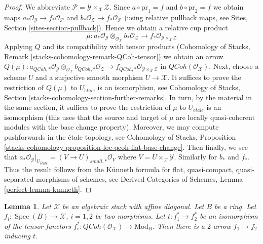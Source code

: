 \documentclass{stacks-project}
\theoremstyle{plain}
\newtheorem{lemma}[subsection]{Lemma}
\theoremstyle{definition}
\theoremstyle{remark}
\numberwithin{equation}{subsection}
\def\Spec{\mathop{\mathrm{Spec}}}
\def\etale{{\acute{e}tale}}
\def\QCoh{\mathit{QCoh}}
\begin{document}
\begin{proof}
We abbreviate $\mathcal{P} = \mathcal{Y} \times_\mathcal{X} \mathcal{Z}$.
Since $a \circ \text{pr}_1 = f$ and $b \circ \text{pr}_2 = f$
we obtain maps $a_*\mathcal{O}_\mathcal{Y} \to f_*\mathcal{O}_\mathcal{P}$
and $b_*\mathcal{O}_\mathcal{Z} \to f_*\mathcal{O}_\mathcal{P}$ (using
relative pullback maps, see Sites, Section \ref{sites-section-pullback}).
Hence we obtain a relative cup product
$$
\mu :
a_*\mathcal{O}_\mathcal{Y}
\otimes_{\mathcal{O}_\mathcal{X}}
b_*\mathcal{O}_\mathcal{Z} \longrightarrow
f_*\mathcal{O}_{\mathcal{Y} \times_\mathcal{X} \mathcal{Z}}
$$
Applying $Q$ and its compatibility with tensor products
(Cohomology of Stacks, Remark \ref{stacks-cohomology-remark-QCoh-tensor})
we obtain an arrow
$Q(\mu) : a_{\QCoh, *}\mathcal{O}_\mathcal{Y}
\otimes_{\mathcal{O}_\mathcal{X}}
b_{\QCoh, *}\mathcal{O}_\mathcal{Z} \to
f_{\QCoh, *}\mathcal{O}_{\mathcal{Y} \times_\mathcal{X} \mathcal{Z}}$
in $\QCoh(\mathcal{O}_\mathcal{X})$.
Next, choose a scheme $U$ and a surjective smooth morphism
$U \to \mathcal{X}$. It suffices to prove the restriction of
$Q(\mu)$ to $U_\etale$ is an isomorphism, see
Cohomology of Stacks, Section \ref{stacks-cohomology-section-further-remarks}.
In turn, by the material in the same section,
it suffices to prove the restriction of $\mu$ to $U_\etale$
is an isomorphism (this uses that the source and target of $\mu$
are locally quasi-coherent modules with the base change property).
Moreover, we may compute pushforwards in the \'etale topology, see
Cohomology of Stacks, Proposition
\ref{stacks-cohomology-proposition-loc-qcoh-flat-base-change}.
Then finally, we see that
$a_*\mathcal{O}_\mathcal{Y}|_{U_\etale} = (V \to U)_{small, *}\mathcal{O}_V$
where $V = U \times_\mathcal{X} \mathcal{Y}$.
Similarly for $b_*$ and $f_*$. Thus the result follows
from the K\"unneth formula for flat, quasi-compact, quasi-separated
morphisms of schemes, see Derived Categories of Schemes,
Lemma \ref{perfect-lemma-kunneth}.
\end{proof}

\begin{lemma}
\label{lemma-fully-faithful}
Let $\mathcal{X}$ be an algebraic stack with affine diagonal.
Let $B$ be a ring. Let $f_i : \Spec(B) \to \mathcal{X}$, $i = 1, 2$
be two morphisms. Let $t : f_1^* \to f_2^*$ be an isomorphism
of the tensor functors
$f_i^* : \QCoh(\mathcal{O}_\mathcal{X}) \to \text{Mod}_B$.
Then there is a $2$-arrow $f_1 \to f_2$ inducing $t$.
\end{lemma}
\end{document}
